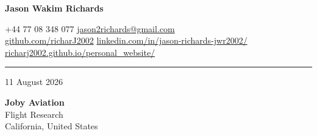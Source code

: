 \documentclass[10pt,a4paper]{article}
\newcommand{\NameSize}{20pt}
\newcommand{\ContactSize}{8pt}
\newcommand{\MetaSize}{8.8pt}
\newcommand{\NameLineSize}{20pt}
\newcommand{\KeywordLineSize}{9pt}
\newcommand{\ContactLineSize}{8pt}
\newcommand{\MetaLineSize}{10.5pt}
\newcommand{\HeaderContactToLine}{2pt}
\newcommand{\HeaderLineToDate}{8pt}
\newcommand{\DateAfter}{22pt}             %
\newcommand{\HeaderLineThickness}{0.5pt}
\begin{document}

\begin{center}



    {
        \fontsize{\NameSize}{\NameLineSize}\selectfont
        \textbf{\textcolor{CVBlack}{Jason Wakim Richards}}
    }


    \vspace{\KeywordLineSize}

    {
        \fontsize{\ContactSize}{\ContactLineSize}
        \selectfont
        \textcolor{CVBlack}
        {
            +44 77 08 348 077
            \quad\textbar\quad
            \href{mailto:jason2richards@gmail.com}{jason2richards@gmail.com}
            \\
            \href{https://github.com/richarJ2002}{github.com/richarJ2002}
            \quad\textbar\quad
            \href{https://www.linkedin.com/in/jason-richards-jwr2002/}
            {linkedin.com/in/jason-richards-jwr2002/}
            \quad\textbar\quad
            \href{https://richarj2002.github.io/personal_website/}{richarj2002.github.io/personal\_website/}
        }
    }

\end{center}

\vspace{\HeaderContactToLine}
\noindent\textcolor{CVBlack}{\rule{\textwidth}{\HeaderLineThickness}}


\vspace{\HeaderLineToDate}

{\fontsize{\MetaSize}{\MetaLineSize}\selectfont
    \textcolor{CVGray}{11 August 2026}}

\vspace{\DateAfter}

{\fontsize{\MetaSize}{\MetaLineSize}\selectfont
    \textbf{\textcolor{CVBlack}{Joby Aviation}}\\
    \textcolor{CVDarkGray}{Flight Research}\\
    \textcolor{CVDarkGray}{California, United States}}
\end{document}

